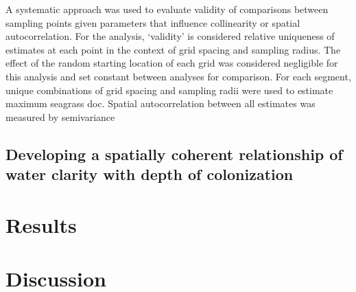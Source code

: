 \documentclass[letterpaper,12pt,oneside]{article}\usepackage[]{graphicx}\usepackage[]{color}
\begin{document}
A systematic approach was used to evaluate validity of comparisons between sampling points given parameters that influence collinearity or spatial autocorrelation.  For the analysis, `validity' is considered relative uniqueness of estimates at each point in the context of grid spacing and sampling radius.  The effect of the random starting location of each grid was considered negligible for this analysis and set constant between analyses for comparison.  For each segment, unique combinations of grid spacing and sampling radii were used to estimate maximum seagrass \ac{doc}.  Spatial autocorrelation between all estimates was measured by semivariance 


\subsection{Developing a spatially coherent relationship of water clarity with depth of colonization}

\section{Results}

\section{Discussion}


\clearpage
\begin{singlespace}


\end{singlespace}
\clearpage

\end{document}
